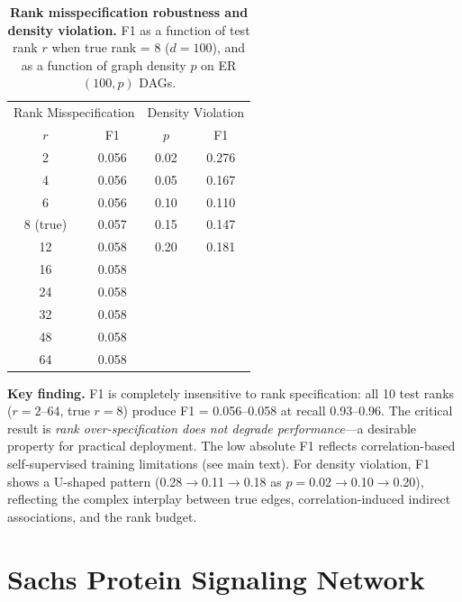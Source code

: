 \documentclass{article}
\theoremstyle{definition}
\begin{document}
\begin{table}[H]
\centering
\caption{\textbf{Rank misspecification robustness and density violation.} F1 as a function of test rank $r$ when true rank = 8 ($d=100$), and as a function of graph density $p$ on ER$(100, p)$ DAGs.}
\label{tab:rankviolation}
\small
\begin{tabular}{cc|cc}
\toprule
\multicolumn{2}{c}{Rank Misspecification} & \multicolumn{2}{c}{Density Violation} \\
$r$ & F1 & $p$ & F1 \\
\midrule
2 & 0.056 & 0.02 & 0.276 \\
4 & 0.056 & 0.05 & 0.167 \\
6 & 0.056 & 0.10 & 0.110 \\
8 (true) & 0.057 & 0.15 & 0.147 \\
12 & 0.058 & 0.20 & 0.181 \\
16 & 0.058 & & \\
24 & 0.058 & & \\
32 & 0.058 & & \\
48 & 0.058 & & \\
64 & 0.058 & & \\
\bottomrule
\end{tabular}

\textbf{Key finding.} F1 is completely insensitive to rank specification: all 10 test ranks ($r=2$--$64$, true $r=8$) produce F1 = 0.056--0.058 at recall 0.93--0.96. The critical result is \emph{rank over-specification does not degrade performance}---a desirable property for practical deployment. The low absolute F1 reflects correlation-based self-supervised training limitations (see main text). For density violation, F1 shows a U-shaped pattern (0.28$\to$0.11$\to$0.18 as $p=$0.02$\to$0.10$\to$0.20), reflecting the complex interplay between true edges, correlation-induced indirect associations, and the rank budget.
\end{table}

\section{Sachs Protein Signaling Network}
\label{app:sachs}
\end{document}
